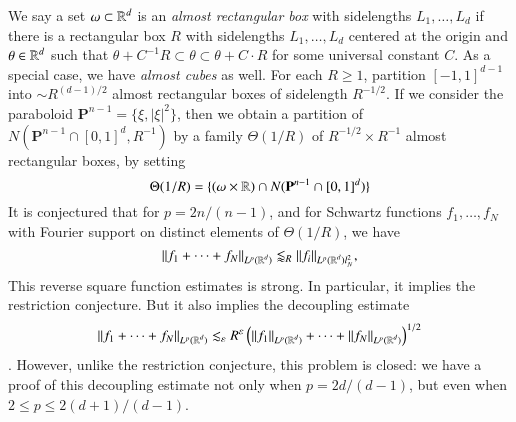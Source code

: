 We say a set $\omega \subset \operatorname{\mathbb{R}}^d$ is an \emph{almost rectangular box} with sidelengths $L_1,\dots,L_d$ if there is a rectangular box $R$ with sidelengths $L_1, \dots, L_d$ centered at the origin and $\theta \in \operatorname{\mathbb{R}}^d$ such that $\theta + C^{-1} R \subset \theta \subset \theta + C \cdot R$ for some universal constant $C$. As a special case, we have \emph{almost cubes} as well. For each $R \geq 1$, partition $[-1,1]^{d-1}$ into $\sim R^{(d-1)/2}$ almost rectangular boxes of sidelength $R^{-1/2}$. If we consider the paraboloid $\mathbf{P}^{n-1} = \{ \xi, |\xi|^2 \}$, then we obtain a partition of $N(\mathbf{P}^{n-1} \cap [0,1]^d, R^{-1})$ by a family $\Theta(1/R)$ of $R^{-1/2} \times R^{-1}$ almost rectangular boxes, by setting
%
\[ \Theta(1/R) = \{ (\omega \times \operatorname{\mathbb{R}}) \cap N(\mathbf{P}^{n-1} \cap [0,1]^d ) \} \]
%
It is conjectured that for $p = 2n/(n-1)$, and for Schwartz functions $f_1, \dots, f_N$ with Fourier support on distinct elements of $\Theta(1/R)$, we have
%
\[ \| f_1 + \dots + f_N \|_{L^p(\operatorname{\mathbb{R}}^d)} \lessapprox_R \| f_i \|_{L^p(\operatorname{\mathbb{R}}^d) l^2_N}, \]
%
This reverse square function estimates is strong. In particular, it implies the restriction conjecture. But it also implies the decoupling estimate
%
\[ \| f_1 + \dots + f_N \|_{L^p(\operatorname{\mathbb{R}}^d)} \lesssim_\varepsilon R^\varepsilon \left( \| f_1 \|_{L^p(\operatorname{\mathbb{R}}^d)} + \dots + \| f_N \|_{L^p(\operatorname{\mathbb{R}}^d)} \right)^{1/2} \].
%
However, unlike the restriction conjecture, this problem is closed: we have a proof of this decoupling estimate not only when $p = 2d/(d-1)$, but even when $2 \leq p \leq 2(d+1)/(d-1)$.


